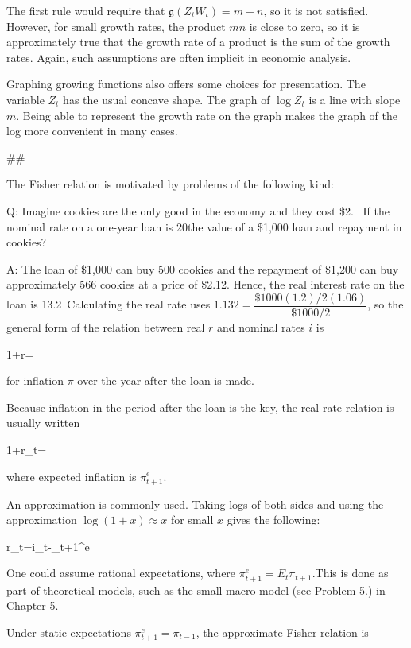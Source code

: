 ﻿\documentclass[oneside]{book}
\begin{document}
The first rule would require that $\mathfrak{g}( Z_{t}W_{t})
=m+n$, so it is not satisfied. However, for small growth rates, the
product $mn$ is close to zero, so it is approximately true that the growth
rate of a product is the sum of the growth rates. Again, such assumptions
are often implicit in economic analysis.

Graphing growing functions also offers some choices for presentation. The
variable $Z_{t}$ has the usual concave shape. The graph of $\log Z_{t}$ is
a line with slope $m.$ Being able to represent the growth rate on the
graph makes the graph of the log more convenient in many cases.



##

The Fisher relation is motivated by problems of the following kind:

Q: Imagine cookies are the only good in the economy and they cost \$2. \
If the nominal rate on a one-year loan is 20\is the value of a \$1,000 loan and repayment in cookies?

A: The loan of \$1,000 can buy 500 cookies and the repayment of \$1,200
can buy approximately 566 cookies at a price of \$2.12. Hence, the real
interest rate on the loan is 13.2\
Calculating the real rate uses $1.132=\dfrac{\$1000(1.2)/2(1.06)}{\$1000/2}$, so the general form of the relation between real $r$ and
nominal rates $i$ is



1+r=


for inflation $\pi $ over the year after the loan is made.

Because inflation in the period after the loan is the key, the real rate relation is usually written



1+r_{t}=


where expected inflation is $\pi _{t+1}^{e}$.

An approximation is commonly used. Taking logs of both sides and using the
approximation $\log ( 1+x) \approx x$ for small $x$ gives the
following:



r_{t}=i_{t}-\pi _{t+1}^{e}


One could assume rational expectations, where $\pi _{t+1}^{e}=E_{t}\pi _{t+1}$.This is done as part of theoretical models, such as the small macro model (see Problem 5.) in Chapter 5.

Under static expectations $\pi _{t+1}^{e}=\pi _{t-1}$, the approximate Fisher relation is
\end{document}
